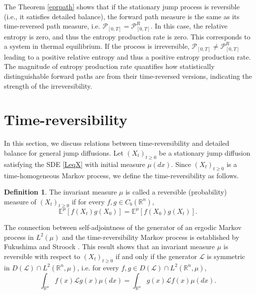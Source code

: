 \documentclass[10pt]{article}
\theoremstyle{definition}
\newtheorem{defn}{Definition}[section]
\theoremstyle{remark}
\numberwithin{equation}{section}
\begin{document}
The Theorem \ref{eprpath} shows that if the stationary jump process is reversible (i.e., it satisfies detailed balance), the forward path measure is the same as its time-reversed path measure, i.e. $\mathcal{P}_{[0,T]} = \mathcal{P}^R_{[0,T]}$. In this case, the relative entropy is zero, and thus the entropy production rate is zero. This corresponds to a system in thermal equilibrium.
If the process is irreversible, $\mathcal{P}_{[0,T]} \neq \mathcal{P}^R_{[0,T]}$ leading to a positive relative entropy and thus a positive entropy production rate. The magnitude of entropy production rate quantifies how statistically distinguishable forward paths are from their time-reversed versions, indicating the strength of the irreversibility.

\section{Time-reversibility}\label{Sec5}

In this section, we discuss relations between time-reversibility and detailed balance for general jump diffusions. 
Let $(X_t)_{t\geq 0}$ be a stationary jump diffusion  satisfying the SDE \eqref{LeqX} with initial measure $\mu(dx)$. Since $(X_t)_{t\geq 0}$ is a time-homogeneous Markov process, we define the time-reversibility as follows.

\begin{defn}
The invariant measure $\mu$ is called a reversible (probability) measure of $(X_t)_{t\geq 0}$ if for every $f,g \in C_{b}(\mathbb{R}^n)$,
\begin{equation*}
    \mathbb{E}^{\mu}[f(X_t)g(X_0)]  = \mathbb{E}^{\mu}[f(X_0)g(X_t)].
\end{equation*}
\end{defn}

The connection between self-adjointness of the generator of an ergodic Markov process in $L^2(\mu)$ and the time-reversibility Markov process is established by Fukushima and Stroock \cite[Theorem 2.3]{FS86}.
This result shows that an invariant measure $\mu$ is reversible with respect to $(X_t)_{t\geq 0}$ if and only if the generator $\mathcal{L}$ is symmetric in $D(\mathcal{L}) \cap L^2(\mathbb{R}^n, \mu)$, i.e. for every $f,g \in D(\mathcal{L}) \cap L^2(\mathbb{R}^n, \mu)$,
\begin{equation*}
    \int_{\mathbb{R}^n} f(x) \mathcal{L}g(x) \mu(dx) = \int_{\mathbb{R}^n} g(x) \mathcal{L} f(x) \mu(dx).
\end{equation*}
\end{document}
